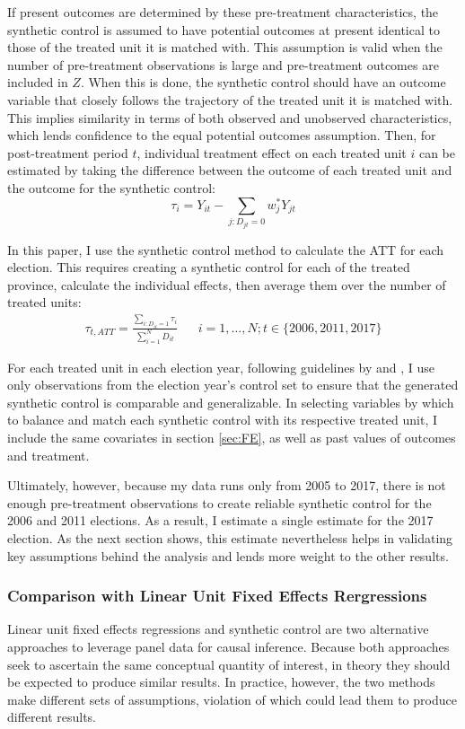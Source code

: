 \documentclass[12pt]{article}\usepackage[]{graphicx}\usepackage[]{color}
\newcommand{\1}{\mathbbm{1}}
\begin{document}
If present outcomes are determined by these pre-treatment characteristics, the synthetic control is assumed to have potential outcomes at present identical to those of the treated unit it is matched with. This assumption is valid when the number of pre-treatment observations is large and pre-treatment outcomes are included in $Z$. When this is done, the synthetic control should have an outcome variable that closely follows the trajectory of the treated unit it is matched with. This implies similarity in terms of both observed and unobserved characteristics, which lends confidence to the equal potential outcomes assumption. Then, for post-treatment period $t$, individual treatment effect on each treated unit $i$ can be estimated by taking the difference between the outcome of each treated unit and the outcome for the synthetic control:
$$
	\tau_i = Y_{it} - \sum_{j:D_{jt}=0}w_j^*Y_{jt}
$$

In this paper, I use the synthetic control method to calculate the ATT for each election. This requires creating a synthetic control for each of the treated province, calculate the individual effects, then average them over the number of treated units:
\begin{align*}
	\tau_{t, ATT} = \frac{\sum_{i: D_{it}=1} \tau_i}{\sum_{i=1}^{N}D_{it}}  && i = 1,\dots,N; t \in \{2006, 2011, 2017\}
\end{align*}

For each treated unit in each election year, following guidelines by \cite{Abadie2010} and \cite{Abadie2015}, I use only observations from the election year's control set to ensure that the generated synthetic control is comparable and generalizable. In selecting variables by which to balance and match each synthetic control with its respective treated unit, I include the same covariates in section \ref{sec:FE}, as well as past values of outcomes and treatment.

Ultimately, however, because my data runs only from 2005 to 2017, there is not enough pre-treatment observations to create reliable synthetic control for the 2006 and 2011 elections. As a result, I estimate a single estimate for the 2017 election. As the next section shows, this estimate nevertheless helps in validating key assumptions behind the analysis and lends more weight to the other results.

\subsubsection{Comparison with Linear Unit Fixed Effects Rergressions}
\label{sec:vs}
Linear unit fixed effects regressions and synthetic control are two alternative approaches to leverage panel data for causal inference. Because both approaches seek to ascertain the same conceptual quantity of interest, in theory they should be expected to produce similar results. In practice, however, the two methods make different sets of assumptions, violation of which could lead them to produce different results.
\end{document}
